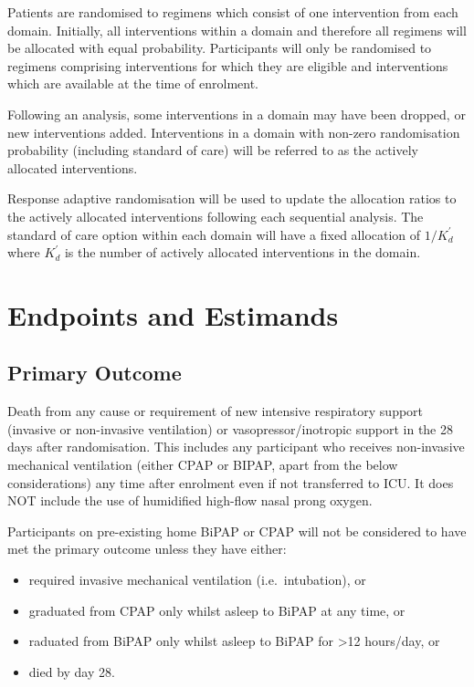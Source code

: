 \documentclass[
  11pt,
]{article}
\providecommand{\tightlist}{%
  \setlength{\itemsep}{0pt}\setlength{\parskip}{0pt}}
\begin{document}
Patients are randomised to regimens which consist of one intervention from each domain.
Initially, all interventions within a domain and therefore all regimens will be allocated with equal probability.
Participants will only be randomised to regimens comprising interventions for which they are eligible and interventions which are available at the time of enrolment.

Following an analysis, some interventions in a domain may have been dropped, or new interventions added.
Interventions in a domain with non-zero randomisation probability (including standard of care) will be referred to as the actively allocated interventions.

Response adaptive randomisation will be used to update the allocation ratios to the actively allocated interventions following each sequential analysis.
The standard of care option within each domain will have a fixed allocation of \(1/K^\prime_d\) where \(K^\prime_d\) is the number of actively allocated interventions in the domain.

\hypertarget{endpoints-and-estimands}{%
\section{Endpoints and Estimands}\label{endpoints-and-estimands}}

\hypertarget{primary-outcome}{%
\subsection{Primary Outcome}\label{primary-outcome}}

Death from any cause or requirement of new intensive respiratory support (invasive or non-invasive ventilation) or vasopressor/inotropic support in the 28 days after randomisation.
This includes any participant who receives non-invasive mechanical ventilation (either CPAP or BIPAP, apart from the below considerations) any time after enrolment even if not transferred to ICU.
It does NOT include the use of humidified high-flow nasal prong oxygen.

Participants on pre-existing home BiPAP or CPAP will not be considered to have met the primary outcome unless they have either:

\begin{itemize}
\tightlist
\item
  required invasive mechanical ventilation (i.e.~intubation), or
\item
  graduated from CPAP only whilst asleep to BiPAP at any time, or
\item
  raduated from BiPAP only whilst asleep to BiPAP for \textgreater12 hours/day, or
\item
  died by day 28.
\end{itemize}
\end{document}

